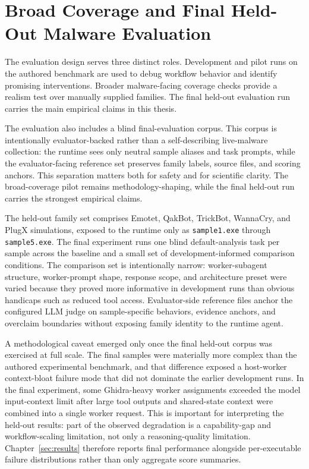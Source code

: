 \section{Broad Coverage and Final Held-Out Malware Evaluation}

The evaluation design serves three distinct roles. Development and pilot runs on the authored benchmark are used to debug workflow behavior and identify promising interventions. Broader malware-facing coverage checks provide a realism test over manually supplied families. The final held-out evaluation run carries the main empirical claims in this thesis.

The evaluation also includes a blind final-evaluation corpus. This corpus is intentionally evaluator-backed rather than a self-describing live-malware collection: the runtime sees only neutral sample aliases and task prompts, while the evaluator-facing reference set preserves family labels, source files, and scoring anchors. This separation matters both for safety and for scientific clarity. The broad-coverage pilot remains methodology-shaping, while the final held-out run carries the strongest empirical claims.

The held-out family set comprises Emotet, QakBot, TrickBot, WannaCry, and PlugX simulations, exposed to the runtime only as \texttt{sample1.exe} through \texttt{sample5.exe}. The final experiment runs one blind default-analysis task per sample across the baseline and a small set of development-informed comparison conditions. The comparison set is intentionally narrow: worker-subagent structure, worker-prompt shape, response scope, and architecture preset were varied because they proved more informative in development runs than obvious handicaps such as reduced tool access. Evaluator-side reference files anchor the configured LLM judge on sample-specific behaviors, evidence anchors, and overclaim boundaries without exposing family identity to the runtime agent.

A methodological caveat emerged only once the final held-out corpus was exercised at full scale. The final samples were materially more complex than the authored experimental benchmark, and that difference exposed a host-worker context-bloat failure mode that did not dominate the earlier development runs. In the final experiment, some Ghidra-heavy worker assignments exceeded the model input-context limit after large tool outputs and shared-state context were combined into a single worker request. This is important for interpreting the held-out results: part of the observed degradation is a capability-gap and workflow-scaling limitation, not only a reasoning-quality limitation. Chapter~\ref{sec:results} therefore reports final performance alongside per-executable failure distributions rather than only aggregate score summaries.


